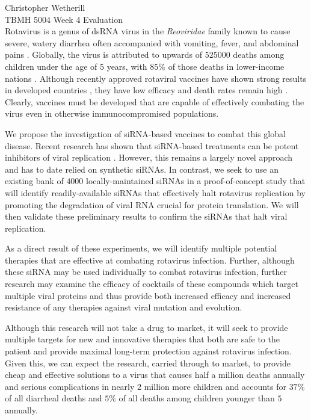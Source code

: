 \documentclass[11pt,final] {article}
\begin{document}
\noindent Christopher Wetherill \\
TBMH 5004 Week 4 Evaluation\\[0.5cm]

Rotavirus is a genus of dsRNA virus in the \textit{Reoviridae} family known to cause severe, watery diarrhea often accompanied with vomiting, fever, and abdominal pains \cite{Maldonado:1990}. Globally, the virus is attributed to upwards of $525000$ deaths among children under the age of 5 years, with $85\%$ of those deaths in lower-income nations \cite{WHO:2008, Tate:2012}. Although recently approved rotaviral vaccines have shown strong results in developed countries \cite{Giaquinto:2011}, they have low efficacy and death rates remain high \cite{Jiang:2010}. Clearly, vaccines must be developed that are capable of effectively combating the virus even in otherwise immunocompromised populations.

We propose the investigation of siRNA-based vaccines to combat this global disease. Recent research has shown that siRNA-based treatments can be potent inhibitors of viral replication \cite{Barik:2010, Geisbert:2010}. However, this remains a largely novel approach and has to date relied on synthetic siRNAs. In contrast, we seek to use an existing bank of $4000$ locally-maintained siRNAs in a proof-of-concept study that will identify readily-available siRNAs that effectively halt rotavirus replication by promoting the degradation of viral RNA crucial for protein translation. We will then validate these preliminary results to confirm the siRNAs that halt viral replication.

As a direct result of these experiments, we will identify multiple potential therapies that are effective at combating rotavirus infection. Further, although these siRNA may be used individually to combat rotavirus infection, further research may examine the efficacy of cocktails of these compounds which target multiple viral proteins and thus provide both increased efficacy and increased resistance of any therapies against viral mutation and evolution.

Although this research will not take a drug to market, it will seek to provide multiple targets for new and innovative therapies that both are safe to the patient and provide maximal long-term protection against rotavirus infection. Given this, we can expect the research, carried through to market, to provide cheap and effective solutions to a virus that causes half a million deaths annually and serious complications in nearly 2 million more children and accounts for $37\%$ of all diarrheal deaths and $5\%$ of all deaths among children younger than $5$ annually.

\clearpage


\end{document}
